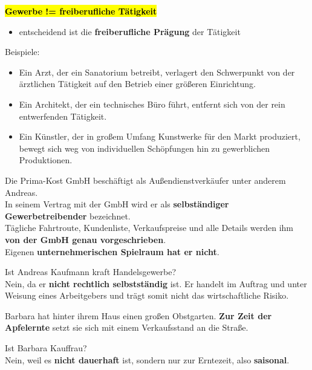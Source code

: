 \documentclass[a4paper, 10pt]{article}
\begin{document}
\noindent\textbf{\hl{Gewerbe != freiberufliche Tätigkeit}}
\begin{itemize}
    \item entscheidend ist die \textbf{freiberufliche Prägung} der Tätigkeit
\end{itemize}
\newpage
Beispiele: 
\begin{itemize}
    \item Ein Arzt, der ein Sanatorium betreibt, verlagert den Schwerpunkt von der ärztlichen Tätigkeit auf den Betrieb einer größeren Einrichtung.
    \item Ein Architekt, der ein technisches Büro führt, entfernt sich von der rein entwerfenden Tätigkeit.
    \item Ein Künstler, der in großem Umfang Kunstwerke für den Markt produziert, bewegt sich weg von individuellen Schöpfungen hin zu gewerblichen Produktionen.
\end{itemize}
\begin{Fall}
    Die Prima-Kost GmbH beschäftigt als Außendienstverkäufer
unter anderem Andreas.\\
In seinem Vertrag mit der GmbH wird er als \textbf{selbständiger
Gewerbetreibender} bezeichnet.\\
Tägliche Fahrtroute, Kundenliste, Verkaufspreise und alle
Details werden ihm \textbf{von der GmbH genau vorgeschrieben}.\\
Eigenen \textbf{unternehmerischen Spielraum hat er nicht}.
\end{Fall}
Ist Andreas Kaufmann kraft Handelsgewerbe?\\[2mm]
Nein, da er \textbf{nicht rechtlich selbstständig} ist. Er handelt im Auftrag und unter Weisung eines Arbeitgebers und trägt somit nicht das wirtschaftliche Risiko.\\[2mm]

\noindent\begin{Fall}
    Barbara hat hinter ihrem Haus einen großen Obstgarten.
\textbf{Zur Zeit der Apfelernte} setzt sie sich mit einem Verkaufsstand
an die Straße.
\end{Fall}
Ist Barbara Kauffrau?\\[2mm]
Nein, weil es \textbf{nicht dauerhaft} ist, sondern nur zur Erntezeit, also \textbf{saisonal}.
\end{document}
